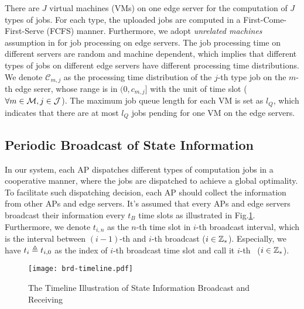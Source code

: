 There are $J$ virtual machines (VMs) on one edge server for the computation of $J$ types of jobs.
For each type, the uploaded jobs are computed in a First-Come-First-Serve (FCFS) manner.
Furthermore, we adopt \emph{unrelated machines} assumption in \cite{tan-online} for job processing on edge servers.
The job processing time on different servers are random and machine dependent, which implies that different types of jobs on different edge servers have different processing time distributions.
We denote $\mathcal{C}_{m,j}$ as the processing time distribution of the $j$-th type job on the $m$-th edge serer, whose range is in $(0, c_{m,j}]$ with the unit of time slot ($\forall m\in\mathcal{M}, j\in\mathcal{J}$).
The maximum job queue length for each VM is set as $l_Q$, which indicates that there are at most $l_Q$ jobs pending for one VM on the edge servers.


\subsection{Periodic Broadcast of State Information}
In our system, each AP dispatches different types of computation jobs in a cooperative manner, where the jobs are dispatched to achieve a global optimality.
To facilitate such dispatching decision, each AP should collect the information from other APs and edge servers.
It's assumed that every APs and edge servers broadcast their information every $t_B$ time slots as illustrated in Fig.\ref{fig:brd-timeline}.
Furthermore, we denote $t_{i,n}$ as the $n$-th time slot in $i$-th broadcast interval, which is the interval between $(i-1)$-th and $i$-th broadcast ($i\in\mathbb{Z}_{*}$).
Especially, we have $t_{i} \triangleq t_{i,0}$ as the index of $i$-th broadcast time slot and call it $i$-th \brpoint~($i\in\mathbb{Z}_{*}$).
\begin{figure}[ht]
    \centering
    \texttt{[image: brd-timeline.pdf]}
    \caption{The Timeline Illustration of State Information Broadcast and Receiving}
    \label{fig:brd-timeline}
\end{figure}

